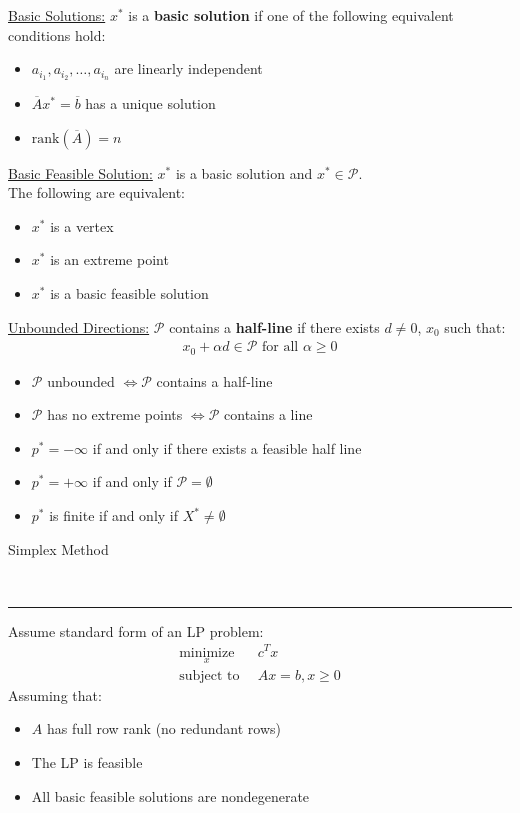 \documentclass{article}
\newcommand{\header}[1]{\begin{large}\noindent #1\end{large}\\\rule{\textwidth}{0.5pt}}
\newcommand{\sheader}[1]{\underline{#1:}}
\newcommand{\gap}{\medskip\\}
\newcommand{\oper}[2]{\underset{#2}{\operatorname{#1}}}
\begin{document}
\sheader{Basic Solutions} $x^*$ is a \textbf{basic solution} if one 
of the following equivalent conditions hold:
\begin{itemize}
    \item $a_{i_1}, a_{i_2}, \ldots, a_{i_n}$ are linearly independent
    \item $\overline{A}x^* = \overline{b}$ has a unique solution
    \item $\textrm{rank}(\overline{A}) = n$
\end{itemize}
\sheader{Basic Feasible Solution} $x^*$ is a basic solution and $x^* \in \mathcal{P}$.
\gap
The following are equivalent:
\begin{itemize}
    \item $x^*$ is a vertex
    \item $x^*$ is an extreme point 
    \item $x^*$ is a basic feasible solution
\end{itemize}

\sheader{Unbounded Directions} $\mathcal{P}$ contains a \textbf{half-line}
if there exists $d \neq 0$, $x_0$ such that:
\begin{align*}
    x_0 + \alpha d \in \mathcal{P} \textrm{  for all  } \alpha \geq 0
\end{align*}
\begin{itemize}
    \item $\mathcal{P}$ unbounded $\iff \mathcal{P}$ contains a half-line
    \item $\mathcal{P}$ has no extreme points $\iff \mathcal{P}$ contains a line
    \item $p^* = -\infty$ if and only if there exists a feasible half line
    \item $p^* = + \infty$ if and only if $\mathcal{P} = \emptyset$
    \item $p^*$ is finite if and only if $X^* \neq \emptyset$
\end{itemize}

\header{Simplex Method}

Assume standard form of an LP problem:
\begin{align*}
    \oper{minimize}{x} \,\,\, &c^Tx\\
    \textrm{subject to}\,\,\, &Ax=b, x\geq 0
\end{align*}
Assuming that:
\begin{itemize}
    \item $A$ has full row rank (no redundant rows)
    \item The LP is feasible
    \item All basic feasible solutions are nondegenerate
\end{itemize}
\pagebreak
\end{document}
